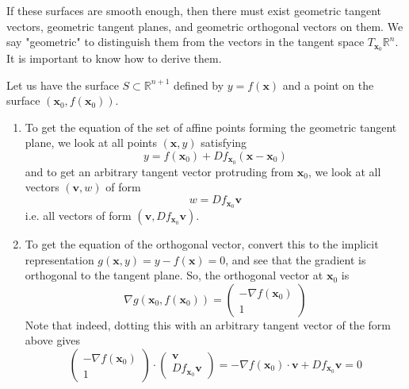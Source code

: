   If these surfaces are smooth enough, then there must exist geometric tangent vectors, geometric tangent planes, and geometric orthogonal vectors on them. We say "geometric" to distinguish them from the vectors in the tangent space $T_{\mathbf{x}_0} \mathbb{R}^n$. It is important to know how to derive them. 

  \begin{theorem}
  Let us have the surface $S \subset \mathbb{R}^{n+1}$ defined by $y = f(\mathbf{x})$ and a point on the surface $(\mathbf{x}_0, f(\mathbf{x}_0))$. 
  \begin{enumerate}
      \item To get the equation of the set of affine points forming the geometric tangent plane, we look at all points $(\mathbf{x}, y)$ satisfying 
      \[y = f(\mathbf{x}_0) + D f_{\mathbf{x}_0} (\mathbf{x} - \mathbf{x}_0)\]
      and to get an arbitrary tangent vector protruding from $\mathbf{x}_0$, we look at all vectors $(\mathbf{v}, w)$ of form 
      \[w = D f_{\mathbf{x}_0} \mathbf{v}\]
      i.e. all vectors of form $(\mathbf{v}, D f_{\mathbf{x}_0} \mathbf{v})$. 
      \item To get the equation of the orthogonal vector, convert this to the implicit representation $g(\mathbf{x}, y) = y - f(\mathbf{x}) = 0$, and see that the gradient is orthogonal to the tangent plane. So, the orthogonal vector at $\mathbf{x}_0$ is 
      \[\nabla g (\mathbf{x}_0, f(\mathbf{x}_0)) = \begin{pmatrix} - \nabla f(\mathbf{x}_0) \\ 1 \end{pmatrix}\]
      Note that indeed, dotting this with an arbitrary tangent vector of the form above gives 
      \[\begin{pmatrix} -\nabla f(\mathbf{x}_0) \\ 1 \end{pmatrix} \cdot \begin{pmatrix} \mathbf{v} \\ D f_{\mathbf{x}_0} \mathbf{v} \end{pmatrix} = - \nabla f(\mathbf{x}_0) \cdot \mathbf{v} + D f_{\mathbf{x}_0} \mathbf{v} = 0\]
  \end{enumerate}
  \end{theorem}

